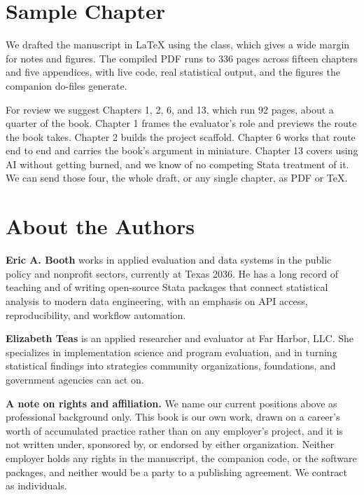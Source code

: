 \documentclass[11pt]{article}
\begin{document}
\section*{Sample Chapter}
We drafted the manuscript in \LaTeX{} using the  class, which gives a wide margin for notes and figures. The compiled PDF runs to 336 pages across fifteen chapters and five appendices, with live code, real statistical output, and the figures the companion do-files generate.

For review we suggest Chapters 1, 2, 6, and 13, which run 92 pages, about a quarter of the book. Chapter 1 frames the evaluator's role and previews the route the book takes. Chapter 2 builds the project scaffold. Chapter 6 works that route end to end and carries the book's argument in miniature. Chapter 13 covers using AI without getting burned, and we know of no competing Stata treatment of it. We can send those four, the whole draft, or any single chapter, as PDF or \TeX{}.

\section*{About the Authors}
\textbf{Eric A. Booth} works in applied evaluation and data systems in the public policy and nonprofit sectors, currently at Texas 2036. He has a long record of teaching and of writing open-source Stata packages that connect statistical analysis to modern data engineering, with an emphasis on API access, reproducibility, and workflow automation.

\textbf{Elizabeth Teas} is an applied researcher and evaluator at Far Harbor, LLC. She specializes in implementation science and program evaluation, and in turning statistical findings into strategies community organizations, foundations, and government agencies can act on.

\textbf{A note on rights and affiliation.} We name our current positions above as professional background only. This book is our own work, drawn on a career's worth of accumulated practice rather than on any employer's project, and it is not written under, sponsored by, or endorsed by either organization. Neither employer holds any rights in the manuscript, the companion code, or the software packages, and neither would be a party to a publishing agreement. We contract as individuals.
\end{document}
